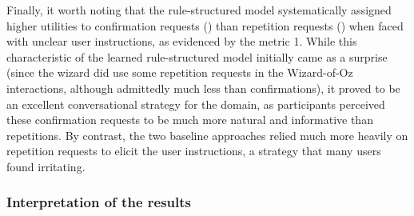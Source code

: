 Finally, it worth noting that the rule-structured model systematically assigned higher utilities to confirmation requests () than repetition requests () when faced with unclear user instructions, as evidenced by the metric 1. While this characteristic of the learned rule-structured model initially came as a surprise (since the wizard did use some repetition requests in the Wizard-of-Oz interactions, although admittedly much less than confirmations), it proved to be an excellent conversational strategy for the domain, as participants perceived these confirmation requests to be much more natural and informative than repetitions. By contrast, the two baseline approaches relied much more heavily on repetition requests to elicit the user instructions, a strategy that many users found irritating. 

\subsubsection*{Interpretation of the results}

